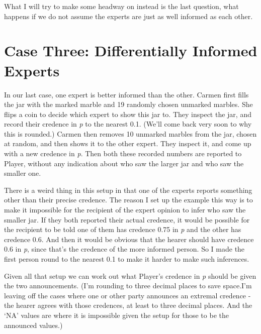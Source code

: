 \documentclass[
  10pt,
  letterpaper,
  DIV=11,
  numbers=noendperiod,
  twoside]{scrartcl}
\begin{document}
What I will try to make some headway on instead is the last question,
what happens if we do not assume the experts are just as well informed
as each other.

\section{Case Three: Differentially Informed
Experts}\label{case-three-differentially-informed-experts}

In our last case, one expert is better informed than the other. Carmen
first fills the jar with the marked marble and 19 randomly chosen
unmarked marbles. She flips a coin to decide which expert to show this
jar to. They inspect the jar, and record their credence in \emph{p} to
the nearest 0.1. (We'll come back very soon to why this is rounded.)
Carmen then removes 10 unmarked marbles from the jar, chosen at random,
and then shows it to the other expert. They inspect it, and come up with
a new credence in \emph{p}. Then both these recorded numbers are
reported to Player, without any indication about who saw the larger jar
and who saw the smaller one.

There is a weird thing in this setup in that one of the experts reports
something other than their precise credence. The reason I set up the
example this way is to make it impossible for the recipient of the
expert opinion to infer who saw the smaller jar. If they both reported
their actual credence, it would be possible for the recipient to be told
one of them has credence 0.75 in \emph{p} and the other has credence
0.6. And then it would be obvious that the hearer should have credence
0.6 in \emph{p}, since that's the credence of the more informed person.
So I made the first person round to the nearest 0.1 to make it harder to
make such inferences.

Given all that setup we can work out what Player's credence in \emph{p}
should be given the two announcements. (I'm rounding to three decimal
places to save space.I'm leaving off the cases where one or other party
announces an extremal credence - the hearer agrees with those credences,
at least to three decimal places. And the `NA' values are where it is
impossible given the setup for those to be the announced values.)
\end{document}
